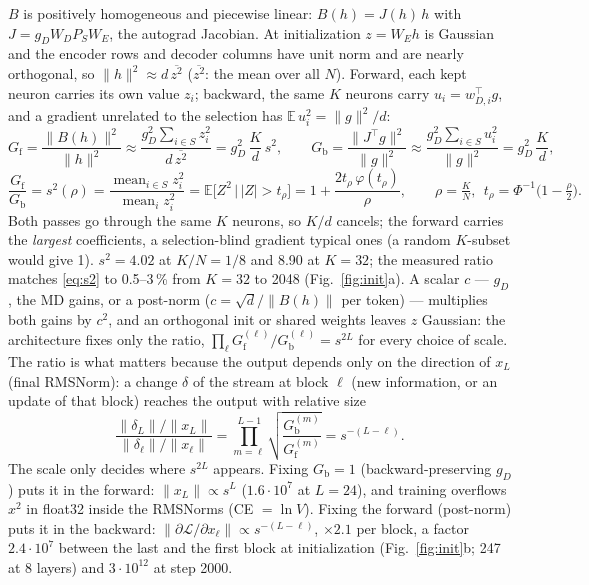 \documentclass[10pt,a4paper]{article}
\newcommand{\Gf}{G_{\mathrm f}}
\newcommand{\Gb}{G_{\mathrm b}}
\begin{document}
\(B\) is positively homogeneous and piecewise linear: \(B(h)=J(h)\,h\) with \(J=g_DW_DP_SW_E\), the autograd
Jacobian.  At initialization \(z=W_Eh\) is Gaussian and the encoder rows and decoder columns have unit norm and
are nearly orthogonal, so \(\|h\|^2\approx d\,\overline{z^2}\) (\(\overline{z^2}\): the mean over all \(N\)).
Forward, each kept neuron carries its own value \(z_i\); backward, the same \(K\) neurons carry
\(u_i=w_{D,i}^\top g\), and a gradient unrelated to the selection has \(\mathbb E\,u_i^2=\|g\|^2/d\):
\begin{equation}
  \Gf=\frac{\|B(h)\|^2}{\|h\|^2}\approx\frac{g_D^2\sum_{i\in S}z_i^2}{d\,\overline{z^2}}=g_D^2\,\frac Kd\,s^2,
  \qquad
  \Gb=\frac{\|J^\top g\|^2}{\|g\|^2}\approx\frac{g_D^2\sum_{i\in S}u_i^2}{\|g\|^2}=g_D^2\,\frac Kd,
  \label{eq:gains}
\end{equation}
\begin{equation}
  \frac{\Gf}{\Gb}=s^2(\rho)=\frac{\operatorname{mean}_{i\in S}z_i^2}{\operatorname{mean}_i z_i^2}
  =\mathbb E\bigl[Z^2\,\big|\,|Z|>t_\rho\bigr]=1+\frac{2t_\rho\,\varphi(t_\rho)}{\rho},
  \qquad \rho=\tfrac KN,\ \ t_\rho=\Phi^{-1}\bigl(1-\tfrac\rho2\bigr).
  \label{eq:s2}
\end{equation}
Both passes go through the same \(K\) neurons, so \(K/d\) cancels; the forward carries the \emph{largest}
coefficients, a selection-blind gradient typical ones (a random \(K\)-subset would give 1).  \(s^2=4.02\) at
\(K/N=1/8\) and 8.90 at \(K=32\); the measured ratio matches \eqref{eq:s2} to 0.5--3\,\% from \(K=32\) to 2048
(Fig.~\ref{fig:init}a).  A scalar \(c\) --- \(g_D\), the MD gains, or a post-norm (\(c=\sqrt d/\|B(h)\|\) per token) ---
multiplies both gains by \(c^2\), and an orthogonal init or shared weights leaves \(z\) Gaussian: the architecture
fixes only the ratio, \(\prod_\ell\Gf^{(\ell)}/\Gb^{(\ell)}=s^{2L}\) for every choice of scale.  The ratio is what
matters because the output depends only on the direction of \(x_L\) (final RMSNorm): a change \(\delta\) of the
stream at block \(\ell\) (new information, or an update of that block) reaches the output with relative size
\begin{equation}
  \frac{\|\delta_L\|/\|x_L\|}{\|\delta_\ell\|/\|x_\ell\|}=\prod_{m=\ell}^{L-1}\sqrt{\frac{\Gb^{(m)}}{\Gf^{(m)}}}=s^{-(L-\ell)} .
  \label{eq:depth}
\end{equation}
The scale only decides where \(s^{2L}\) appears.  Fixing \(\Gb=1\) (backward-preserving \(g_D\)) puts it in the
forward: \(\|x_L\|\propto s^L\) (\(1.6\cdot10^7\) at \(L=24\)), and training overflows \(x^2\) in float32 inside the
RMSNorms (CE \(=\ln V\)).  Fixing the forward (post-norm) puts it in the backward:
\(\|\partial\mathcal L/\partial x_\ell\|\propto s^{-(L-\ell)}\), \(\times2.1\) per block, a factor \(2.4\cdot10^{7}\)
between the last and the first block at initialization (Fig.~\ref{fig:init}b; 247 at 8 layers) and
\(3\cdot10^{12}\) at step 2000.
\end{document}
